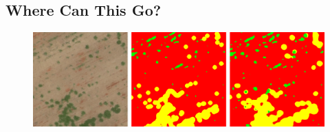 \documentclass[
]{dtuposter}
\begin{document}
\begin{dtupostercontent}
\section{Where Can This Go?}

\begin{figure}
	\begin{fadebox}\begin{center}
			\includegraphics[width=\linewidth,origin=c]{reconst}
	\end{center}\end{fadebox}
\end{figure}


\end{dtupostercontent}
\end{document}
